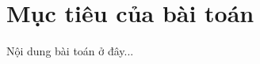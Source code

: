 \documentclass[12pt, a4paper]{article}
\begin{document}


\newpage
\tableofcontents
\newpage

\section{Mục tiêu của bài toán}
Nội dung bài toán ở đây...
\end{document}
